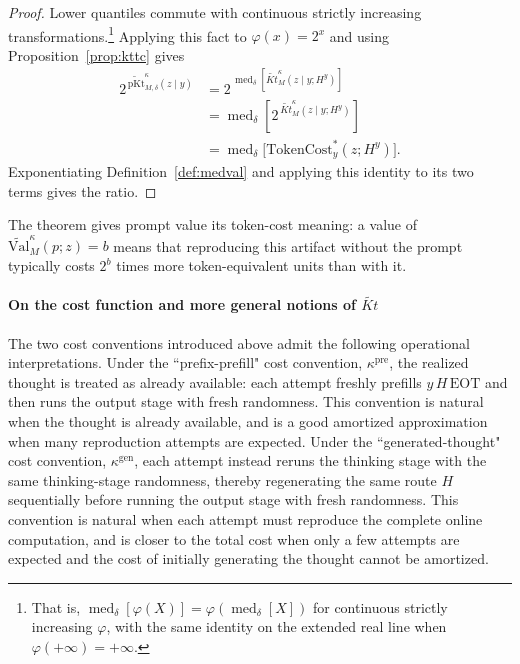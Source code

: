 \documentclass[letterpaper]{article} %
\theoremstyle{definition}
\theoremstyle{remark}
\newcommand{\EOT}{\mathrm{EOT}}
\newcommand{\Val}{\mathrm{Val}}
\newcommand{\TC}{\mathrm{TokenCost}}
\DeclareMathOperator{\med}{med}
\newcommand{\pKt}{\mathrm{pKt}}
\newcommand{\pKtt}{\widetilde{\pKt}}
\begin{document}
\begin{proof}
Lower quantiles commute with continuous strictly increasing
transformations.\footnote{That is,
$\med_\delta[\varphi(X)]=\varphi(\med_\delta[X])$ for continuous strictly
increasing $\varphi$, with the same identity on the extended real line when
$\varphi(+\infty)=+\infty$.}
Applying this fact to \(\varphi(x)=2^x\) and using
Proposition~\ref{prop:kttc} gives
\[
\begin{aligned}
2^{\,\pKtt^{\kappa}_{M,\delta}(z\mid y)}
&=
2^{\,\med_\delta\!\left[
\widetilde{Kt}^{\kappa}_M(z\mid y;H^y)
\right]}\\
&=
\med_\delta\!\left[
2^{\,\widetilde{Kt}^{\kappa}_M(z\mid y;H^y)}
\right]\\
&=
\med_\delta\bigl[\TC_y^*(z;H^y)\bigr].
\end{aligned}
\]
Exponentiating Definition~\ref{def:medval} and applying this identity to its
two terms gives the ratio.
\end{proof}

The theorem gives prompt value its token-cost meaning: a value of
$\widetilde{\Val}^{\kappa}_M(p;z) = b$ means that reproducing this artifact
without the prompt typically costs $2^{b}$ times more token-equivalent units
than with it. 

\paragraph{On the cost function and more general notions of $\widetilde{Kt}$}
The two cost conventions introduced above admit the following operational
interpretations. Under the
``prefix-prefill" cost convention,
\(\kappa^{\mathrm{pre}}\), the realized thought is treated as already
available: each attempt freshly prefills \(y\,H\,\EOT\) and then runs the
output stage with fresh randomness. This convention is natural when the thought
is already available, and is a good amortized approximation when many
reproduction attempts are expected. Under the ``generated-thought" cost
convention, \(\kappa^{\mathrm{gen}}\), each
attempt instead reruns the thinking stage with the same thinking-stage
randomness, thereby regenerating the same route \(H\) sequentially before
running the output stage with fresh randomness. This convention is natural
when each attempt must reproduce the complete online computation, and is closer
to the total cost when only a few attempts are expected and the cost of
initially generating the thought cannot be amortized.
\end{document}
